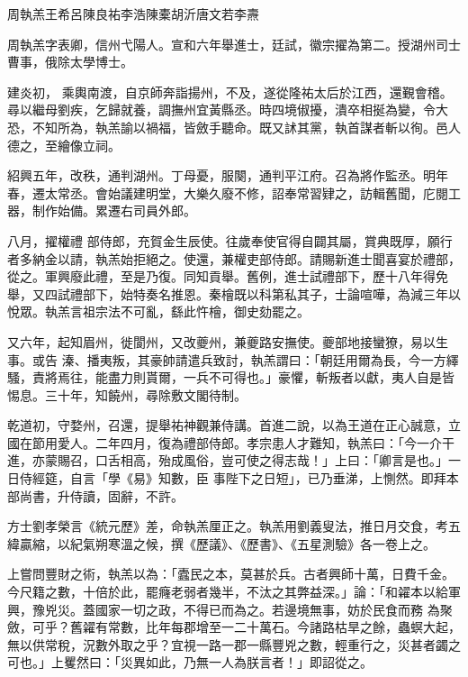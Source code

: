 
\begin{pinyinscope}

 周執羔王希呂陳良祐李浩陳橐胡沂唐文若李燾



 周執羔字表卿，信州弋陽人。宣和六年舉進士，廷試，徽宗擢為第二。授湖州司士曹事，俄除太學博士。



 建炎初，
 乘輿南渡，自京師奔詣揚州，不及，遂從隆祐太后於江西，還覲會稽。尋以繼母劉疾，乞歸就養，調撫州宜黃縣丞。時四境俶擾，潰卒相挻為變，令大恐，不知所為，執羔諭以禍福，皆斂手聽命。既又訹其黨，執首謀者斬以徇。邑人德之，至繪像立祠。



 紹興五年，改秩，通判湖州。丁母憂，服闋，通判平江府。召為將作監丞。明年春，遷太常丞。會始議建明堂，大樂久廢不修，詔奉常習肄之，訪輯舊聞，庀閱工器，制作始備。累遷右司員外郎。



 八月，擢權禮
 部侍郎，充賀金生辰使。往歲奉使官得自闢其屬，賞典既厚，願行者多納金以請，執羔始拒絕之。使還，兼權吏部侍郎。請賜新進士聞喜宴於禮部，從之。軍興廢此禮，至是乃復。同知貢舉。舊例，進士試禮部下，歷十八年得免舉，又四試禮部下，始特奏名推恩。秦檜既以科第私其子，士論喧嘩，為減三年以悅眾。執羔言祖宗法不可亂，繇此忤檜，御史劾罷之。



 又六年，起知眉州，徙閬州，又改夔州，兼夔路安撫使。夔部地接蠻獠，易以生事。或告
 溱、播夷叛，其豪帥請遣兵致討，執羔謂曰：「朝廷用爾為長，今一方繹騷，責將焉往，能盡力則貰爾，一兵不可得也。」豪懼，斬叛者以獻，夷人自是皆惕息。三十年，知饒州，尋除敷文閣待制。



 乾道初，守婺州，召還，提舉祐神觀兼侍講。首進二說，以為王道在正心誠意，立國在節用愛人。二年四月，復為禮部侍郎。孝宗患人才難知，執羔曰：「今一介干進，亦蒙賜召，口舌相高，殆成風俗，豈可使之得志哉！」上曰：「卿言是也。」一日侍經筵，自言「學《易》知數，臣
 事陛下之日短」，已乃垂涕，上惻然。即拜本部尚書，升侍讀，固辭，不許。



 方士劉孝榮言《統元歷》差，命執羔厘正之。執羔用劉義叟法，推日月交食，考五緯贏縮，以紀氣朔寒溫之候，撰《歷議》、《歷書》、《五星測驗》各一卷上之。



 上嘗問豐財之術，執羔以為：「蠹民之本，莫甚於兵。古者興師十萬，日費千金。今尺籍之數，十倍於此，罷癃老弱者幾半，不汰之其弊益深。」論：「和糴本以給軍興，豫兇災。蓋國家一切之政，不得已而為之。若邊境無事，妨於民食而務
 為聚斂，可乎？舊糴有常數，比年每郡增至一二十萬石。今諸路枯旱之餘，蟲螟大起，無以供常稅，況數外取之乎？宜視一路一郡一縣豐兇之數，輕重行之，災甚者蠲之可也。」上矍然曰：「災異如此，乃無一人為朕言者！」即詔從之。




\end{pinyinscope}
